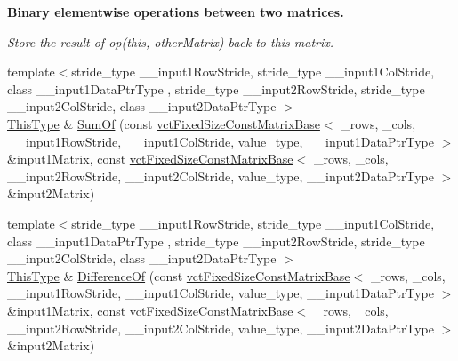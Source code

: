 \begin{Indent}{\bf Binary elementwise operations between two matrices.}\par
{\em Store the result of op(this, other\+Matrix) back to this matrix. }\begin{DoxyCompactItemize}
\item 
{\footnotesize template$<$stride\+\_\+type \+\_\+\+\_\+input1\+Row\+Stride, stride\+\_\+type \+\_\+\+\_\+input1\+Col\+Stride, class \+\_\+\+\_\+input1\+Data\+Ptr\+Type , stride\+\_\+type \+\_\+\+\_\+input2\+Row\+Stride, stride\+\_\+type \+\_\+\+\_\+input2\+Col\+Stride, class \+\_\+\+\_\+input2\+Data\+Ptr\+Type $>$ }\\\hyperlink{classvct_fixed_size_const_matrix_base_a7ec66a96ed7e08ce9ff54093133c9d8d}{This\+Type} \& \hyperlink{classvct_fixed_size_matrix_base_a487cb1e2640869958179238849ef3758}{Sum\+Of} (const \hyperlink{classvct_fixed_size_const_matrix_base}{vct\+Fixed\+Size\+Const\+Matrix\+Base}$<$ \+\_\+rows, \+\_\+cols, \+\_\+\+\_\+input1\+Row\+Stride, \+\_\+\+\_\+input1\+Col\+Stride, value\+\_\+type, \+\_\+\+\_\+input1\+Data\+Ptr\+Type $>$ \&input1\+Matrix, const \hyperlink{classvct_fixed_size_const_matrix_base}{vct\+Fixed\+Size\+Const\+Matrix\+Base}$<$ \+\_\+rows, \+\_\+cols, \+\_\+\+\_\+input2\+Row\+Stride, \+\_\+\+\_\+input2\+Col\+Stride, value\+\_\+type, \+\_\+\+\_\+input2\+Data\+Ptr\+Type $>$ \&input2\+Matrix)
\item 
{\footnotesize template$<$stride\+\_\+type \+\_\+\+\_\+input1\+Row\+Stride, stride\+\_\+type \+\_\+\+\_\+input1\+Col\+Stride, class \+\_\+\+\_\+input1\+Data\+Ptr\+Type , stride\+\_\+type \+\_\+\+\_\+input2\+Row\+Stride, stride\+\_\+type \+\_\+\+\_\+input2\+Col\+Stride, class \+\_\+\+\_\+input2\+Data\+Ptr\+Type $>$ }\\\hyperlink{classvct_fixed_size_const_matrix_base_a7ec66a96ed7e08ce9ff54093133c9d8d}{This\+Type} \& \hyperlink{classvct_fixed_size_matrix_base_a905ade9ecaf1d84adc0a539b2b212c91}{Difference\+Of} (const \hyperlink{classvct_fixed_size_const_matrix_base}{vct\+Fixed\+Size\+Const\+Matrix\+Base}$<$ \+\_\+rows, \+\_\+cols, \+\_\+\+\_\+input1\+Row\+Stride, \+\_\+\+\_\+input1\+Col\+Stride, value\+\_\+type, \+\_\+\+\_\+input1\+Data\+Ptr\+Type $>$ \&input1\+Matrix, const \hyperlink{classvct_fixed_size_const_matrix_base}{vct\+Fixed\+Size\+Const\+Matrix\+Base}$<$ \+\_\+rows, \+\_\+cols, \+\_\+\+\_\+input2\+Row\+Stride, \+\_\+\+\_\+input2\+Col\+Stride, value\+\_\+type, \+\_\+\+\_\+input2\+Data\+Ptr\+Type $>$ \&input2\+Matrix)
\item 

\end{DoxyCompactItemize}
\end{Indent}
